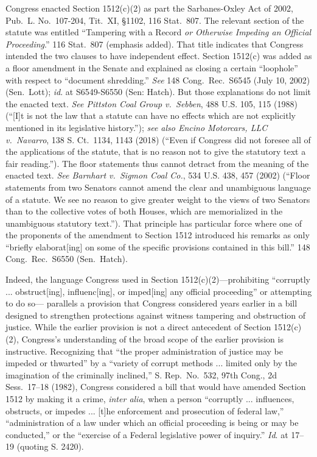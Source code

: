 Congress enacted Section 1512(c)(2) as part the Sarbanes-Oxley Act of 2002, Pub.\ L. No.~107-204, Tit.~XI, \S 1102, 116 Stat.~807.
The relevant section of the statute was entitled “Tampering with a Record \textit{or Otherwise Impeding an Official Proceeding}.”
116 Stat.~807 (emphasis added).
That title indicates that Congress intended the two clauses to have independent effect.
Section 1512(c) was added as a floor amendment in the Senate and explained as closing a certain “loophole” with respect to “document shredding.”
\textit{See} 148 Cong.\ Rec.\ S6545 (July 10, 2002) (Sen.~Lott);
\textit{id}. at S6549-S6550 (Sen: Hatch).
But those explanations do not limit the enacted text.
\textit{See Pittston Coal Group v.\ Sebben}, 488 U.S. 105, 115 (1988) (“[I]t is not the law that a statute can have no effects which are not explicitly mentioned in its legislative history.”);
\textit{see also Encino Motorcars, LLC v.\ Navarro}, 138 S. Ct.~1134, 1143 (2018) (“Even if Congress did not foresee all of the applications of the statute, that is no reason not to give the statutory text a fair reading.”).
The floor statements thus cannot detract from the meaning of the enacted text.
\textit{See Barnhart v.\ Sigmon Coal Co.}, 534 U.S. 438, 457 (2002) (“Floor statements from two Senators cannot amend the clear and unambiguous language of a statute.
We see no reason to give greater weight to the views of two Senators than to the collective votes of both Houses, which are memorialized in the unambiguous statutory text.”).
That principle has particular force where one of the proponents of the amendment to Section 1512 introduced his remarks as only “briefly elaborat[ing] on some of the specific provisions contained in this bill.”
148 Cong.\ Rec.\ S6550 (Sen.~Hatch).

Indeed, the language Congress used in Section 1512(c)(2)---prohibiting “corruptly ... obstruct[ing], influenc[ing], or imped[ing] any official proceeding” or attempting to do so--- parallels a provision that Congress considered years earlier in a bill designed to strengthen protections against witness tampering and obstruction of justice.
While the earlier provision is not a direct antecedent of Section 1512(c)(2), Congress’s understanding of the broad scope of the earlier provision is instructive.
Recognizing that “the proper administration of justice may be impeded or thwarted” by a “variety of corrupt methods ... limited only by the imagination of the criminally inclined,” S. Rep.\ No.~532, 97th Cong., 2d Sess.~17--18 (1982), Congress considered a bill that would have amended Section 1512 by making it a crime, \textit{inter alia}, when a person “corruptly ... influences, obstructs, or impedes ... [t]he enforcement and prosecution of federal law,” “administration of a law under which an official proceeding is being or may be conducted,” or the “exercise of a Federal legislative power of inquiry.” \textit{Id}. at 17--19 (quoting S. 2420).


